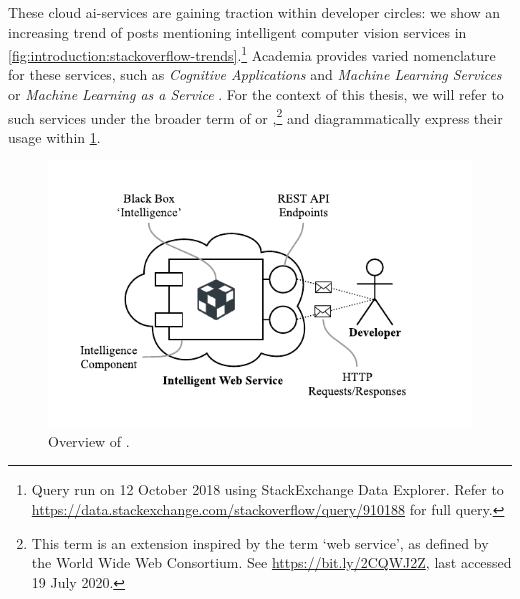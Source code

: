 These cloud \gls{ai}-services are gaining traction within developer circles: we show an increasing trend of  posts mentioning intelligent computer vision services in \cref{fig:introduction:stackoverflow-trends}.\footnote{Query run on 12 October 2018 using StackExchange Data Explorer. Refer to \url{https://data.stackexchange.com/stackoverflow/query/910188} for full query.}
Academia provides varied nomenclature for these services, such as \textit{Cognitive Applications} and \textit{Machine Learning Services} \citep{Hwang:2017tr} or \textit{Machine Learning as a Service} \citep{Ribeiro:2015dz}. 
For the context of this thesis, we will refer to such services under the broader term of \textbf{} or \textbf{},\footnote{This term is an extension inspired by the term `web service', as defined by the World Wide Web Consortium. See \url{https://bit.ly/2CQWJ2Z}, last accessed 19 July 2020.} and diagrammatically express their usage within \cref{fig:introduction:cloud-intelliegnce-service}.

\begin{figure}[h!]
\centering
\includegraphics[width=0.9\linewidth]{cloud-intelliegnce-service}
\caption[Overview of intelligent web services]{Overview of .}
\label{fig:introduction:cloud-intelliegnce-service}
\end{figure}

